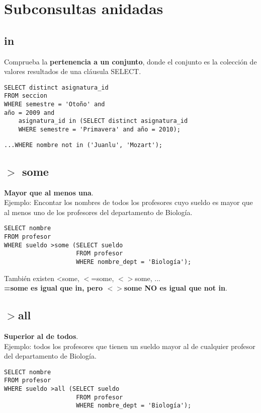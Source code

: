 \documentclass{article}
\begin{document}
\section{Subconsultas anidadas}

\subsection{in}
Comprueba la \textbf{pertenencia a un conjunto}, donde el conjunto es la colección de valores resultados de una cláusula SELECT.
\begin{verbatim}
SELECT distinct asignatura_id
FROM seccion
WHERE semestre = 'Otoño' and
año = 2009 and
    asignatura_id in (SELECT distinct asignatura_id
    WHERE semestre = 'Primavera' and año = 2010);
\end{verbatim}

\begin{verbatim}
...WHERE nombre not in ('Juanlu', 'Mozart');
\end{verbatim}

\newpage

\subsection{$>$ some}
\textbf{Mayor que al menos una}. \\
Ejemplo: Encontar los nombres de todos los profesores cuyo sueldo es mayor que al menos uno de los profesores del departamento de Biología.

\begin{verbatim}
SELECT nombre
FROM profesor
WHERE sueldo >some (SELECT sueldo
                    FROM profesor
                    WHERE nombre_dept = 'Biología');
\end{verbatim}     

También existen <some, $<$=some, $<>$some, ... \\
\textbf{=some es igual que in, pero $<>$some NO es igual que not in}.

\subsection{$>$all}
\textbf{Superior al de todos}. \\
Ejemplo: todos los profesores que tienen un sueldo mayor al de cualquier profesor del departamento de Biología.

\begin{verbatim}
SELECT nombre
FROM profesor
WHERE sueldo >all (SELECT sueldo
                    FROM profesor
                    WHERE nombre_dept = 'Biología');
\end{verbatim}   
\end{document}
